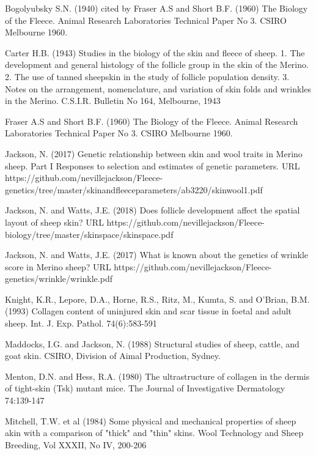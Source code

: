 \documentclass[titlepage]{article}  %
\begin{document}
\clearpage
\begin{thebibliography}{99}

 Bogolyubsky S.N. (1940) cited by Fraser A.S and Short B.F. (1960) The Biology of the Fleece. Animal Research Laboratories Technical Paper No 3. CSIRO Melbourne 1960.


Carter H.B. (1943) Studies in the biology of the skin and fleece of sheep. 1. The development and general histology of the follicle group in the skin of the Merino. 2. The use of tanned sheepskin in the study of follicle population density. 3. Notes on the arrangement, nomenclature, and variation of skin folds and wrinkles in the Merino. C.S.I.R. Bulletin No 164, Melbourne, 1943

Fraser A.S and Short B.F. (1960) The Biology of the Fleece. Animal Research Laboratories Technical Paper No 3. CSIRO Melbourne 1960.


Jackson, N. (2017) Genetic relationship between skin and wool traits in Merino sheep. Part I Responses to selection and estimates of genetic parameters. URL https://github.com/nevillejackson/Fleece-genetics/tree/master/skinandfleeceparameters/ab3220/skinwool1.pdf

Jackson, N. and Watts, J.E. (2018) Does follicle development affect the spatial layout of sheep skin? URL https://github.com/nevillejackson/Fleece-biology/tree/master/skinspace/skinspace.pdf


Jackson, N. and Watts, J.E. (2017) What is known about the genetics of wrinkle score in Merino sheep? URL https://github.com/nevillejackson/Fleece-genetics/wrinkle/wrinkle.pdf

Knight, K.R., Lepore, D.A., Horne, R.S., Ritz, M., Kumta, S. and O'Brian, B.M. (1993) Collagen content of uninjured skin and scar tissue in foetal and adult sheep. Int. J. Exp. Pathol. 74(6):583-591

Maddocks, I.G. and Jackson, N. (1988) Structural studies of sheep, cattle, and goat skin. CSIRO, Division of Aimal Production, Sydney.

Menton, D.N. and Hess, R.A. (1980) The ultrastructure of collagen in the dermis of tight-skin (Tsk) mutant mice. The Journal of Investigative Dermatology 74:139-147

Mitchell, T.W. et al (1984) Some physical and mechanical properties of sheep akin with a comparison of "thick" and "thin" skins. Wool Technology and Sheep Breeding, Vol XXXII, No IV, 200-206



\end{thebibliography}
\end{document}
